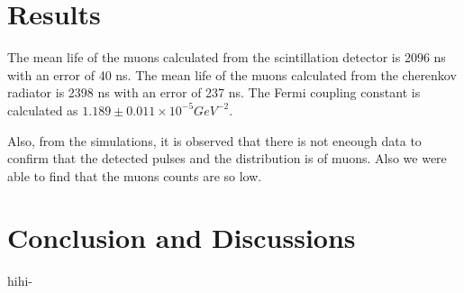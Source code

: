 \documentclass{article}
\begin{document}
\begin{multicols}{2}
\section{\label{results}Results}

The mean life of the muons calculated from the scintillation detector is 2096 ns with an error of 40 ns. The mean life of the muons calculated from the cherenkov radiator is 2398 ns with an error of 237 ns. The Fermi coupling constant is calculated as $1.189 \pm 0.011 \times 10^{-5} GeV^{-2}$.


Also, from the simulations, it is observed that there is not eneough data to confirm that the detected pulses and the distribution is of muons. Also we were able to find that the muons counts are so low.

\section{\label{Conclusion}Conclusion and Discussions}

hihi-\cite{ROOT}

\end{multicols}


\end{document}
